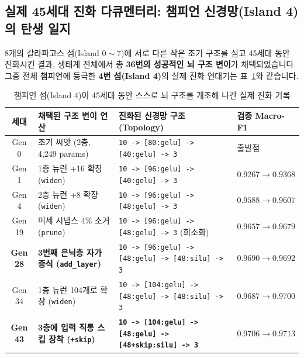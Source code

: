 \documentclass[11pt,a4paper]{article}
\begin{document}
\subsection{실제 45세대 진화 다큐멘터리: 챔피언 신경망(Island 4)의 탄생 일지}

8개의 갈라파고스 섬(Island $0 \sim 7$)에 서로 다른 작은 초기 구조를 심고 45세대 동안 진화시킨 결과, 생태계 전체에서 총 \textbf{36번의 성공적인 뇌 구조 변이}가 채택되었습니다. 그중 전체 챔피언에 등극한 \textbf{4번 섬(Island 4)}의 실제 진화 연대기는 표~\ref{tab:lineage}와 같습니다.

\begin{table}[H]
\centering
\caption{챔피언 섬(Island 4)이 45세대 동안 스스로 뇌 구조를 개조해 나간 실제 진화 기록}
\label{tab:lineage}
\footnotesize
\begin{tabularx}{\textwidth}{cl>{\raggedright\arraybackslash}Xl}
\toprule
\textbf{세대} & \textbf{채택된 구조 변이 연산} & \textbf{진화된 신경망 구조 (Topology)} & \textbf{검증 Macro-F1} \\
\midrule
Gen 0 & 초기 씨앗 (2층, 4,249 params) & \texttt{10 -> [80:gelu] -> [40:gelu] -> 3} & 출발점 \\
Gen 1 & 1층 뉴런 +16 확장 (\texttt{widen}) & \texttt{10 -> [96:gelu] -> [40:gelu] -> 3} & $0.9267 \rightarrow \mathbf{0.9368}$ \\
Gen 4 & 2층 뉴런 +8 확장 (\texttt{widen}) & \texttt{10 -> [96:gelu] -> [48:gelu] -> 3} & $0.9588 \rightarrow \mathbf{0.9607}$ \\
Gen 19 & 미세 시냅스 4\% 소거 (\texttt{prune}) & \texttt{10 -> [96:gelu] -> [48:gelu] -> 3} (희소화) & $0.9657 \rightarrow \mathbf{0.9679}$ \\
\textbf{Gen 28} & \textbf{3번째 은닉층 자가 증식 (\texttt{add\_layer})} & \texttt{10 -> [96:gelu] -> [48:gelu] -> [48:silu] -> 3} & $0.9690 \rightarrow \mathbf{0.9692}$ \\
Gen 34 & 1층 뉴런 104개로 확장 (\texttt{widen}) & \texttt{10 -> [104:gelu] -> [48:gelu] -> [48:silu] -> 3} & $0.9687 \rightarrow \mathbf{0.9700}$ \\
\textbf{Gen 43} & \textbf{3층에 입력 직통 스킵 장착 (\texttt{+skip})} & \textbf{\texttt{10 -> [104:gelu] -> [48:gelu] -> [48+skip:silu] -> 3}} & $0.9706 \rightarrow \mathbf{0.9713}$ \\
\bottomrule
\end{tabularx}
\end{table}
\end{document}
